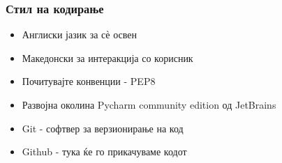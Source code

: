 \documentclass{beamer}
\begin{document}
\begin{frame}
\frametitle{Стил на кодирање}

\begin{itemize}

\item Англиски јазик за с\`е освен

\item Македонски за интеракција со корисник

\item Почитувајте конвенции - PEP8

\item Развојна околина Pycharm community edition од JetBrains

\item Git - софтвер за верзионирање на код

\item Github - тука ќе го прикачуваме кодот

\end{itemize}

\end{frame}
\end{document}
